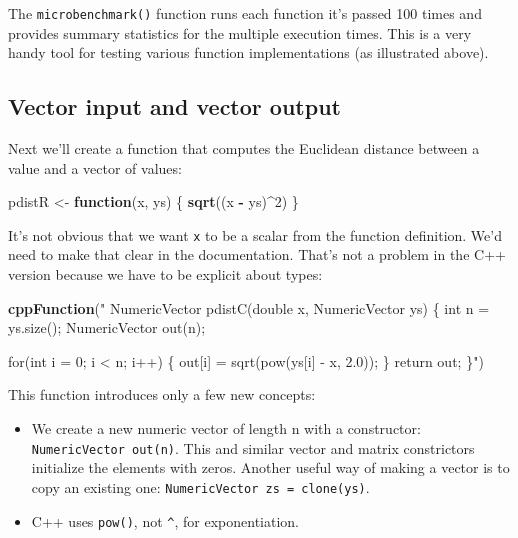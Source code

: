 \documentclass[]{krantz}
\makeatletter
\newenvironment{Shaded}{\begin{snugshade}}{\end{snugshade}}
\newcommand{\ControlFlowTok}[1]{\textcolor[rgb]{0.27,0.27,0.27}{\textbf{#1}}}
\newcommand{\DecValTok}[1]{\textcolor[rgb]{0.06,0.06,0.06}{#1}}
\newcommand{\KeywordTok}[1]{\textcolor[rgb]{0.27,0.27,0.27}{\textbf{#1}}}
\newcommand{\NormalTok}[1]{#1}
\newcommand{\OperatorTok}[1]{\textcolor[rgb]{0.43,0.43,0.43}{\textbf{#1}}}
\newcommand{\StringTok}[1]{\textcolor[rgb]{0.5,0.5,0.5}{#1}}
\providecommand{\tightlist}{%
  \setlength{\itemsep}{0pt}\setlength{\parskip}{0pt}}
\newenvironment{kframe}{%
\medskip{}
\setlength{\fboxsep}{.8em}
 \def\at@end@of@kframe{}%
 \ifinner\ifhmode%
  \def\at@end@of@kframe{\end{minipage}}%
  \begin{minipage}{\columnwidth}%
 \fi\fi%
 \def\FrameCommand##1{\hskip\@totalleftmargin \hskip-\fboxsep
 \colorbox{shadecolor}{##1}\hskip-\fboxsep
     \hskip-\linewidth \hskip-\@totalleftmargin \hskip\columnwidth}%
 \MakeFramed {\advance\hsize-\width
   \@totalleftmargin\z@ \linewidth\hsize
   \@setminipage}}%
 {\par\unskip\endMakeFramed%
 \at@end@of@kframe}
\renewenvironment{Shaded}{\begin{kframe}}{\end{kframe}}
\makeatother
\begin{document}
The \texttt{microbenchmark()} function runs each function it's passed 100 times and provides summary statistics for the multiple execution times. This is a very handy tool for testing various function implementations (as illustrated above).

\hypertarget{vector-input-and-vector-output}{%
\subsection{Vector input and vector output}\label{vector-input-and-vector-output}}

Next we'll create a function that computes the Euclidean distance between a value and a vector of values:

\begin{Shaded}
\begin{Highlighting}[]
\NormalTok{pdistR <-}\StringTok{ }\ControlFlowTok{function}\NormalTok{(x, ys) \{}
  \KeywordTok{sqrt}\NormalTok{((x }\OperatorTok{-}\StringTok{ }\NormalTok{ys)}\OperatorTok{^}\DecValTok{2}\NormalTok{)}
\NormalTok{\}}
\end{Highlighting}
\end{Shaded}

It's not obvious that we want \texttt{x} to be a scalar from the function definition. We'd need to make that clear in the documentation. That's not a problem in the C++ version because we have to be explicit about types:

\begin{Shaded}
\begin{Highlighting}[]
\KeywordTok{cppFunction}\NormalTok{(}\StringTok{"}
\StringTok{  NumericVector pdistC(double x, NumericVector ys) \{}
\StringTok{  int n = ys.size();}
\StringTok{  NumericVector out(n);}

\StringTok{  for(int i = 0; i < n; i++) \{}
\StringTok{    out[i] = sqrt(pow(ys[i] - x, 2.0));}
\StringTok{  \}}
\StringTok{  return out;}
\StringTok{  \}"}\NormalTok{)}
\end{Highlighting}
\end{Shaded}

This function introduces only a few new concepts:

\begin{itemize}
\tightlist
\item
  We create a new numeric vector of length n with a constructor: \texttt{NumericVector\ out(n)}. This and similar vector and matrix constrictors initialize the elements with zeros. Another useful way of making a vector is to copy an existing one: \texttt{NumericVector\ zs\ =\ clone(ys)}.
\item
  C++ uses \texttt{pow()}, not \texttt{\^{}}, for exponentiation.
\end{itemize}
\end{document}
